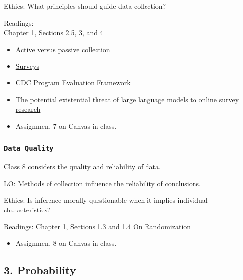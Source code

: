 \documentclass[11pt,]{article}
\providecommand{\tightlist}{%
  \setlength{\itemsep}{0pt}\setlength{\parskip}{0pt}}
\begin{document}
Ethics: What principles should guide data collection?

Readings:\\
Chapter 1, Sections 2.5, 3, and 4

\begin{itemize}
\tightlist
\item
  \href{https://www.informationgovernanceservices.com/articles/active-vs-passive-digital-data-collection-ethical-risks-of-an-ambiguous-distinction/}{Active
  versus passive collection}\\
\item
  \href{https://www.qualtrics.com/articles/strategy-research/survey-basics/}{Surveys}\\
\item
  \href{https://www.cdc.gov/evaluation/media/pdfs/2025/12/CDC-Program-Evaluation-Framework-Action-Guide.pdf}{CDC
  Program Evaluation Framework}\\
\item
  \href{https://www.pnas.org/doi/epdf/10.1073/pnas.2518075122}{The
  potential existential threat of large language models to online survey
  research}
\end{itemize}

\begin{itemize}
\item Assignment 7 on Canvas in class.
\end{itemize}

\subsubsection{\texorpdfstring{\texttt{Data\ Quality}}{Data Quality}}\label{data-quality}

Class 8 considers the quality and reliability of data.

LO: Methods of collection influence the reliability of conclusions.

Ethics: Is inference morally questionable when it implies individual
characteristics?

Readings: Chapter 1, Sections 1.3 and 1.4
\href{https://www.povertyactionlab.org/resource/randomization}{On
Randomization}

\begin{itemize}
\item Assignment 8 on Canvas in class.
\end{itemize}

\subsection{3. Probability}\label{probability}
\end{document}
